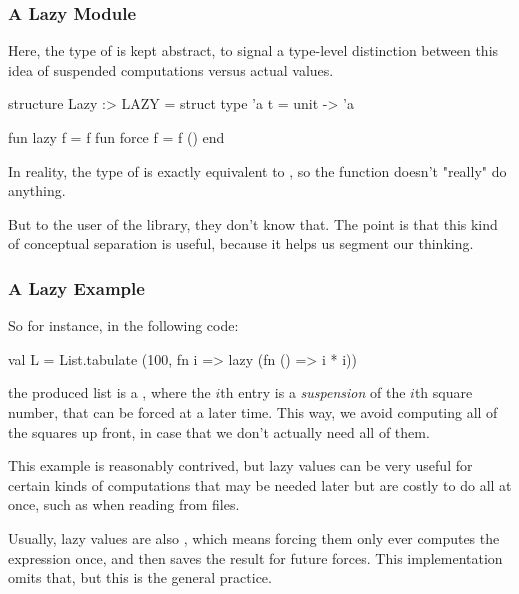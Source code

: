 \documentclass[aspectratio=169, handout]{beamer}
\begin{document}
\begin{frame}[fragile]
  \frametitle{A Lazy Module}

  \tgs

  Here, the type of  is kept abstract, to signal a type-level
  distinction between this idea of suspended computations versus actual values.

  \pause
  \vspace{\fill}

  \begin{codeblock}
    structure Lazy :> LAZY =
      struct
        type 'a t = unit -> 'a

        fun lazy f  = f
        fun force f = f ()
      end
  \end{codeblock}

  In reality, the type of  is exactly equivalent to ,
  so the  function doesn't "really" do anything.

  \pause
  \vspace{\fill}

  But to the user of the library, they don't know that. The point is that this
  kind of conceptual separation is useful, because it helps us segment our
  thinking.
\end{frame}

\begin{frame}[fragile]
  \frametitle{A Lazy Example}

  So for instance, in the following code:
  \begin{codeblock}
    val L = List.tabulate (100, fn i => lazy (fn () => i * i))
  \end{codeblock}
  the produced list  is a , where the $i$th
  entry is a \textit{suspension} of the $i$th square number, that can be forced at a
  later time. This way, we avoid computing all of the squares up front, in case
  that we don't actually need all of them.

  \pause
  \vspace{\fill}

  This example is reasonably contrived, but lazy values can be very useful for
  certain kinds of computations that may be needed later but are costly to do
  all at once, such as when reading from files.

  \pause
  \vspace{\fill}

  Usually, lazy values are also , which means forcing them only
  ever computes the expression once, and then saves the result for future forces.
  This implementation omits that, but this is the general practice.
\end{frame}
\end{document}
